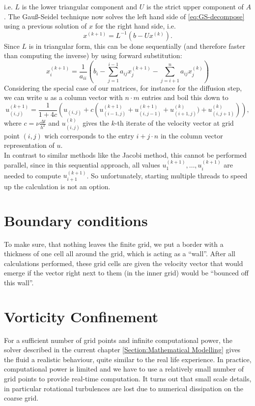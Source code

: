 \documentclass[a4paper,10pt,oneside,final,german,openbib,pdftex,titlepage]{scrbook}
\begin{document}
i.e. $L$ is the lower triangular component and $U$ is the strict upper component of $A$. 
The Gauß-Seidel technique now solves the left hand side of \ref{eq:GS-decompose} using a previous solution of $x$ for the right hand side, i.e.
\begin{equation}
x^{(k+1)}=L^{-1}(b-Ux^{(k)}).
\end{equation}
Since $L$ is in triangular form, this can be done sequentially (and therefore faster than computing the inverse) by using forward substitution:
\begin{equation}
x^{(k+1)}_i=\frac{1}{a_{ii}}\left( b_i - \sum_{j=1}^{i-1} a_{ij}x_j^{(k+1)} - \sum_{j=i+1}^{n} a_{ij}x_j^{(k)} \right)
\end{equation} Considering the special case of our matrices, for instance for the diffusion step, we can write $u$ as a column vector with $n\cdot m$ entries and boil this down to
\begin{equation}
u^{(k+1)}_{(i,j)} = \frac{1}{1+4c} \left( u_{(i,j)} + c\left(u^{(k+1)}_{(i-1,j)} + u^{(k+1)}_{(i,j-1)} + u^{(k)}_{(i+1,j)}) + u^{(k)}_{(i,j+1)}\right) \right),
\end{equation}
where $c= \nu\frac{\Delta t}{h^2}$ and $u^{(k)}_{(i,j)}$ gives the $k$-th iterate of the velocity vector at grid point $(i,j)$ wich corresponds to the entry $i+j \cdot n$ in the column vector representation of $u$.\\

In contrast to similar methods like the Jacobi method, this cannot be performed parallel, since in this sequential approach, all values $u_1^{(k+1)}, \dots, u_i^{(k+1)}$ are needed to compute $u_{i+1}^{(k+1)}$. So unfortunately, starting multiple threads to speed up the calculation is not an option.

\section{Boundary conditions}
To make sure, that nothing leaves the finite grid, we put a border with a thickness of one cell all around the grid, which is acting as a ``wall''. After all calculations performed, these grid cells are given the velocity vector that would emerge if the vector right next to them (in the inner grid) would be ``bounced off this wall''.\\

\section{Vorticity Confinement}
For a sufficient number of grid points and infinite computational power, the solver described in the current chapter \ref{Section:Mathematical Modelling} gives the fluid a realistic behaviour, quite similar to the real life experience. In practice, computational power is limited and we have to use a relatively small number of grid points to provide real-time computation. It turns out that small scale details, in particular rotational turbulences are lost due to numerical dissipation on the coarse grid.\\
\end{document}
